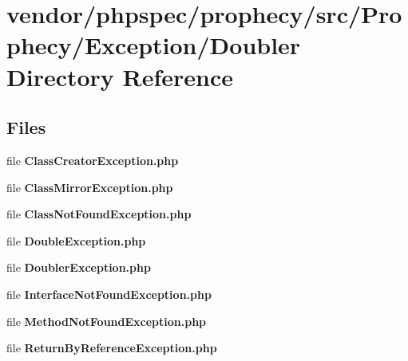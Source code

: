 \section{vendor/phpspec/prophecy/src/\+Prophecy/\+Exception/\+Doubler Directory Reference}
\label{dir_82b264aadba549c45756c9e2c458fe6b}
\subsection*{Files}
\begin{DoxyCompactItemize}
\item 
file {\bf Class\+Creator\+Exception.\+php}
\item 
file {\bf Class\+Mirror\+Exception.\+php}
\item 
file {\bf Class\+Not\+Found\+Exception.\+php}
\item 
file {\bf Double\+Exception.\+php}
\item 
file {\bf Doubler\+Exception.\+php}
\item 
file {\bf Interface\+Not\+Found\+Exception.\+php}
\item 
file {\bf Method\+Not\+Found\+Exception.\+php}
\item 
file {\bf Return\+By\+Reference\+Exception.\+php}
\end{DoxyCompactItemize}
